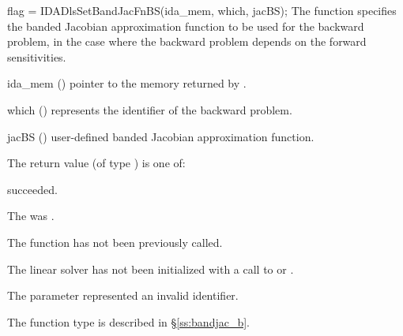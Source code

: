 {
  flag = IDADlsSetBandJacFnBS(ida\_mem, which, jacBS);
}
{
  The function  specifies the banded Jacobian
  approximation function to be used for the backward problem, in the case
  where the backward problem depends on the forward sensitivities.
}
{
  \begin{args}
  \item[ida\_mem] ()
    pointer to the {\idas} memory returned by .
  \item[which] ()
    represents the identifier of the backward problem.
  \item[jacBS] ()
    user-defined banded Jacobian approximation function.
  \end{args}
}
{
  The return value  (of type ) is one of:
  \begin{args}
  \item[\Id{IDADLS\_SUCCESS}] 
     succeeded.
  \item[\Id{IDADLS\_MEM\_NULL}]
    The  was .
  \item[\Id{IDADLS\_NO\_ADJ}]
    The function  has not been previously called.
  \item[\Id{IDADLS\_LMEM\_NULL}]
    The linear solver has not been initialized with a call to  or
    .
  \item[\Id{IDADLS\_ILL\_INPUT}]
    The parameter  represented an invalid identifier.
  \end{args}
}
{
  The function type  is described in \S\ref{ss:bandjac_b}.
}


